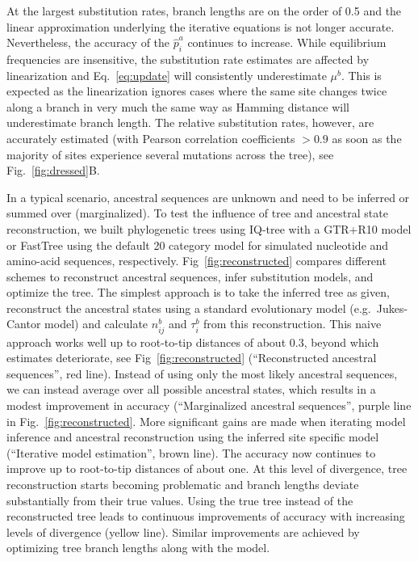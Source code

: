 \documentclass[aps,rmp,twocolumn]{revtex4}
\newcommand{\eqp}{p}
\begin{document}
At the largest substitution rates, branch lengths are on the order of 0.5 and the linear approximation underlying the iterative equations is not longer accurate.
Nevertheless, the accuracy of the $\hat{\eqp}_i^a$ continues to increase.
While equilibrium frequencies are insensitive, the substitution rate estimates are affected by linearization and Eq.~\ref{eq:update} will consistently underestimate $\mu^b$.
This is expected as the linearization ignores cases where the same site changes twice along a branch in very much the same way as Hamming distance will underestimate branch length.
The relative substitution rates, however, are accurately estimated (with Pearson correlation coefficients $>0.9$ as soon as the majority of sites experience several mutations across the tree), see Fig.~\ref{fig:dressed}B.

In a typical scenario, ancestral sequences are unknown and need to be inferred or summed over (marginalized).
To test the influence of tree and ancestral state reconstruction, we built phylogenetic trees using IQ-tree \citep{nguyen_iq-tree:_2015} with a GTR+R10 model or FastTree \citep{FastTree} using the default 20 category model for simulated nucleotide and amino-acid sequences, respectively.
Fig~\ref{fig:reconstructed} compares different schemes to reconstruct ancestral sequences, infer substitution models, and optimize the tree.
The simplest approach is to take the inferred tree as given, reconstruct the ancestral states using a standard evolutionary model (e.g.~Jukes-Cantor model) and calculate $n^b_{ij}$ and $\tau_i^b$ from this reconstruction.
This naive approach works well up to root-to-tip distances of about 0.3, beyond which estimates deteriorate, see Fig~\ref{fig:reconstructed} (``Reconstructed ancestral sequences'', red line).
Instead of using only the most likely ancestral sequences, we can instead average over all possible ancestral states, which results in a modest improvement in accuracy (``Marginalized ancestral sequences'', purple line in Fig.~\ref{fig:reconstructed}.
More significant gains are made when iterating model inference and ancestral reconstruction using the inferred site specific model (``Iterative model estimation'', brown line).
The accuracy now continues to improve up to root-to-tip distances of about one.
At this level of divergence, tree reconstruction starts becoming problematic and branch lengths deviate substantially from their true values.
Using the true tree instead of the reconstructed tree leads to continuous improvements of accuracy with increasing levels of divergence (yellow line).
Similar improvements are achieved by optimizing tree branch lengths along with the model.
\end{document}

